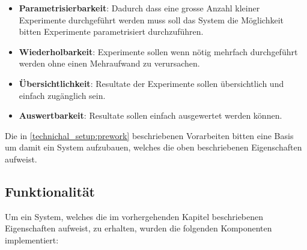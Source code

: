 \begin{itemize}
	\item \textbf{Parametrisierbarkeit}: Dadurch dass eine grosse Anzahl kleiner Experimente durchgeführt werden muss soll das System die Möglichkeit bitten Experimente parametrisiert durchzuführen.
	\item \textbf{Wiederholbarkeit}: Experimente sollen wenn nötig mehrfach durchgeführt werden ohne einen Mehraufwand zu verursachen. 
	\item \textbf{Übersichtlichkeit}: Resultate der Experimente sollen übersichtlich und einfach zugänglich sein.
	\item \textbf{Auswertbarkeit}: Resultate sollen  einfach ausgewertet werden können.
\end{itemize}

Die in \ref{technichal_setup:prework} beschriebenen Vorarbeiten bitten eine Basis um damit ein System aufzubauen, welches die oben beschriebenen Eigenschaften aufweist.
\subsection{Funktionalität}
\label{technical_setup:functionality}
Um ein System, welches die im vorhergehenden Kapitel beschriebenen Eigenschaften aufweist, zu erhalten, wurden die folgenden Komponenten implementiert:

